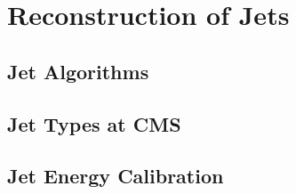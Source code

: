\section{Reconstruction of Jets}
\label{sec:jets_reco}

\subsection{Jet Algorithms}
\label{subsec:jets_algos}

\subsection{Jet Types at CMS}
\label{subsec:jets_types}

\subsection{Jet Energy Calibration}
\label{subsec:jets_calib}


